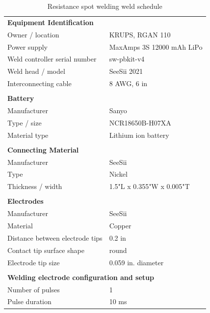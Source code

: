 \documentclass{article}
\begin{document}
\begin{table}
\centering
\caption{Resistance spot welding weld schedule}
\label{tab:weldequip}
\begin{tabular}{|l l|}
\hline
\multicolumn{2}{|l|}{\textbf{Equipment Identification}} \\
Owner / location &  KRUPS, RGAN 110 \\
Power supply & MaxAmps 3S 12000 mAh LiPo \\
Weld controller serial number & sw-pbkit-v4 \\
Weld head / model & SeeSii 2021 \\
Interconnecting cable & 8 AWG, 6 in \\
&\\
\hline
\multicolumn{2}{|l|}{\textbf{Battery}} \\
Manufacturer & Sanyo \\
Type / size & NCR18650B-H07XA \\
Material type & Lithium ion battery \\
&\\
\hline
\multicolumn{2}{|l|}{\textbf{Connecting Material}} \\
Manufacturer & SeeSii \\
Type & Nickel \\
Thickness / width & 1.5"L x 0.355"W x 0.005"T \\
&\\
\hline
\multicolumn{2}{|l|}{\textbf{Electrodes}} \\
Manufacturer & SeeSii \\
Material & Copper \\
Distance between electrode tips & 0.2 in \\
Contact tip surface shape & round \\
Electrode tip size & 0.059 in. diameter\\
&\\
\hline
\multicolumn{2}{|l|}{\textbf{Welding electrode configuration and setup}} \\
Number of pulses &  1 \\
Pulse duration & 10 ms \\
\hline
\end{tabular}
\end{table}
\end{document}
